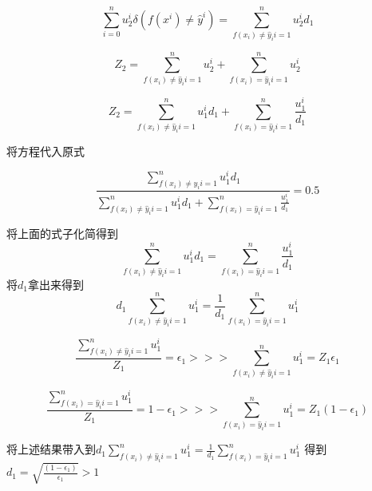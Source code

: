 \begin{equation*}
    \sum_{i=0}^{n} u_2^i \delta(f(x^i) \neq \hat{y}^i) = \sum_{f(x_i) \neq \hat{y}_i {i=1}}^n u_2^i d_1
\end{equation*}

\begin{equation*}
    Z_2 = \sum_{f(x_i) \neq \hat{y}_i {i=1}}^n u_2^i + \sum_{f(x_i) = \hat{y}_i {i=1}}^n u_2^i
\end{equation*}

\begin{equation*}
    Z_2 = \sum_{f(x_i) \neq \hat{y}_i {i=1}}^n u_1^i d_1 + \sum_{f(x_i) = \hat{y}_i {i=1}}^n \frac{u_1^i}{d_1}
\end{equation*}

将方程代入原式

\begin{equation*}
    \frac{ \sum_{f(x_i) \neq \hat{y}_i {i=1}}^n u_1^i d_1}{\sum_{f(x_i) \neq \hat{y}_i {i=1}}^n u_1^i d_1 + \sum_{f(x_i) = \hat{y}_i {i=1}}^n \frac{u_1^i}{d_1}}
    = 0.5
\end{equation*}


将上面的式子化简得到
\begin{equation*}
    \sum_{f(x_i) \neq \hat{y}_i {i=1}}^n u_1^i d_1 = \sum_{f(x_i) = \hat{y}_i {i=1}}^n \frac{u_1^i}{d_1}
\end{equation*}
将$d_1$拿出来得到
\begin{equation*}
    d_1\sum_{f(x_i) \neq \hat{y}_i {i=1}}^n u_1^i  =  \frac{1}{d_1}\sum_{f(x_i) = \hat{y}_i {i=1}}^n u_1^i
\end{equation*}

\begin{equation*}
    \frac{\sum_{f(x_i) \neq \hat{y}_i {i=1}}^n u_1^i}{Z_1} = \epsilon_1 >>> \sum_{f(x_i) \neq \hat{y}_i {i=1}}^n u_1^i = Z_1 \epsilon_1
\end{equation*}

\begin{equation*}
    \frac{\sum_{f(x_i) = \hat{y}_i {i=1}}^n u_1^i}{Z_1} = 1 - \epsilon_1 >>> \sum_{f(x_i) = \hat{y}_i {i=1}}^n u_1^i = Z_1 (1 - \epsilon_1)
\end{equation*}

将上述结果带入到$d_1\sum_{f(x_i) \neq \hat{y}_i {i=1}}^n u_1^i  =  \frac{1}{d_1}\sum_{f(x_i) = \hat{y}_i {i=1}}^n u_1^i$ 得到
$d_1 = \sqrt{\frac{(1 - \epsilon_1)}{\epsilon_1}} > 1$ 


